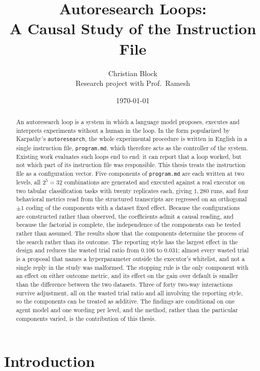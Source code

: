\documentclass[11pt]{article}
\title{Autoresearch Loops:\\A Causal Study of the Instruction File}
\author{Christian Block\\\small Research project with Prof.\ Ramesh}
\date{\today}
\begin{document}
\maketitle

\begin{abstract}
An autoresearch loop is a system in which a language model proposes, executes and interprets experiments without a human in the loop. In the form popularized by Karpathy's \texttt{autoresearch}, the whole experimental procedure is written in English in a single instruction file, \texttt{program.md}, which therefore acts as the controller of the system. Existing work evaluates such loops end to end: it can report that a loop worked, but not which part of its instruction file was responsible. This thesis treats the instruction file as a configuration vector. Five components of \texttt{program.md} are each written at two levels, all $2^5 = 32$ combinations are generated and executed against a real executor on two tabular classification tasks with twenty replicates each, giving $1{,}280$ runs, and four behavioral metrics read from the structured transcripts are regressed on an orthogonal $\pm 1$ coding of the components with a dataset fixed effect. Because the configurations are constructed rather than observed, the coefficients admit a causal reading, and because the factorial is complete, the independence of the components can be tested rather than assumed. The results show that the components determine the process of the search rather than its outcome. The reporting style has the largest effect in the design and reduces the wasted trial ratio from $0.106$ to $0.031$; almost every wasted trial is a proposal that names a hyperparameter outside the executor's whitelist, and not a single reply in the study was malformed. The stopping rule is the only component with an effect on either outcome metric, and its effect on the gain over default is smaller than the difference between the two datasets. Three of forty two-way interactions survive adjustment, all on the wasted trial ratio and all involving the reporting style, so the components can be treated as additive. The findings are conditional on one agent model and one wording per level, and the method, rather than the particular components varied, is the contribution of this thesis.
\end{abstract}

\section{Introduction}
\label{sec:intro}
\end{document}
